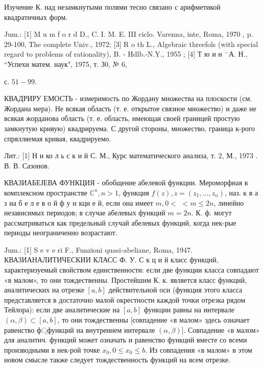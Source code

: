 \documentclass[10pt]{article}
\begin{document}
Изучение К. над незамкнутыми полями тесно связано с арифметикой квадратичных форм.



Jum.: [1] M u m f o r d D., C. I. M. E. III ciclo. Varenna, inte, Roma, 1970 , p. 29-100, The complete Univ., 1972; [3] $\mathrm{R}$ o $\mathrm{t} \mathrm{h}$ L., Algebraic threefols (with special regard to problems of rationality), B. - Hdlb.-N.Y., 1955 ; [4] Т ю и н $^{-}$А. Н., “Успехи матем. наук", 1975, т. З0, № 6,

с. $51-99$.



КВАДРИРУ ЕМОСТЬ - измеримость по Жордану множества на плоскости (см. Жордана мера). Не всякая область (т. е. открытое связное множество) и даже не всякая жорданова область (т. е. область, имеющая своей границей простую замкнутую кривую) квадрируема. С другой стороны, множество, граница к-рого спрялляемая кривая, квадрируемо.



Лит.: [1] Н и ко л ь с к и й С. М., Курс математического анализа, т. 2, М., 1973 . В. В. Сазонов.



КВАЗИАБЕЈЕВА ФУНКЦИЯ - обобщение абелевой функции. Мероморфная в комплексном пространстве $\mathbb{C}^{n}, n>1$, функция $f(z), z=\left(z_{1}, \ldots, z_{n}\right)$, наз. к в а з иа б е л е в о й ф у н кци е й, если она имеет $m, 0<$ $<m \leqslant 2 n$, линейно независимых периодов; в случае абелевых функций $m=2 n$. К. ф. могут рассматриваться как предельный случай абелевых функций, когда нек-рые периоды неограниченно возрастают.



Jum.: [1] S e v e ri F., Funzioni quasi-abeliane, Roma, 1947. КВАЗИАНАЛИТИЧЕСКИИ КЛАСС Ф. У. С к ц и й класс функций, характеризуемый свойством единственности: если две функции класса совпадают «в малом», то они тождественны. Простейшим К. к. является класс функций, аналитических на отрезке $[a, b]$ действительной оси (функция этого класса представляется в достаточно малой окрестности каждой точки отрезка рядом Тейлора): если две аналитические на $[a, b]$ функции равны на интервале $(\alpha, \beta) \subset[a, b]$, то они тождественны [совпадение «в малом» здесь означает равенство ф্функций на внутреннем интервале $(\alpha, \beta)]$. Совпадение «в малом» для аналитич. функций может означать и равенство функций вместе со всеми производными в нек-рой точке $x_{0}, 0 \leqslant x_{0} \leqslant b$. Из совпадения «в малом» в этом новом смысле также следует тождественность функций на всем отрезке.
\end{document}
